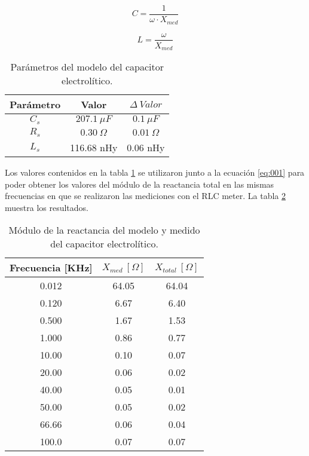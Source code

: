 \documentclass[a4paper,10pt]{article}
\begin{document}
		\begin{equation}\label{eq:003}
			C = \frac{1}{\omega\cdot X_{med}}
		\end{equation}
		
		\begin{equation}\label{eq:004}
			L = \frac{\omega}{X_{med}}
		\end{equation}
		
		\begin{table}[!htp]
			\centering
			\begin{tabular}{|c|c|c|}
				\hline
				Parámetro & Valor & $\Delta~Valor$ \\ 
				\hline
				$C_s$ &	$207.1~\mu F$ & $0.1~\mu F$ \\
				\hline
				$R_s$ &	$0.30~\Omega$ & $0.01~\Omega$ \\
				\hline
				$L_s$ &	116.68 nHy & 0.06 nHy \\
				\hline
			\end{tabular}
			\caption{Parámetros del modelo del capacitor electrolítico.}
			\label{tab:010}
		\end{table}	

		\indent Los valores contenidos en la tabla \ref{tab:010} se utilizaron 
		junto a la ecuación \ref{eq:001} para poder obtener los valores del 
		módulo de la reactancia total en las mismas frecuencias en que se 
		realizaron las mediciones con el RLC meter. La tabla \ref{tab:011} 
		muestra los resultados.
		
		\begin{table}[!htp]
			\centering
			\begin{tabular}{|c|c|c|}
				\hline
				Frecuencia [KHz] & $X_{med}~[\Omega]$ & $X_{total}~[\Omega]$ \\
				\hline
				0.012 &	64.05 & 64.04 \\
				\hline
				0.120 &	6.67 & 6.40 \\
				\hline
				0.500 &	1.67 & 1.53 \\
				\hline
				1.000 &	0.86 & 0.77 \\
				\hline
				10.00 &	0.10 & 0.07 \\
				\hline
				20.00 &	0.06 & 0.02 \\
				\hline
				40.00 & 0.05 & 0.01 \\
				\hline
				50.00 & 0.05 & 0.02 \\
				\hline
				66.66 &	0.06 & 0.04 \\
				\hline
				100.0 &	0.07 & 0.07 \\
				\hline	  
			\end{tabular}
			\caption{Módulo de la reactancia del modelo y medido del capacitor 
			electrolítico.}
			\label{tab:011}
		\end{table}	
\end{document}
